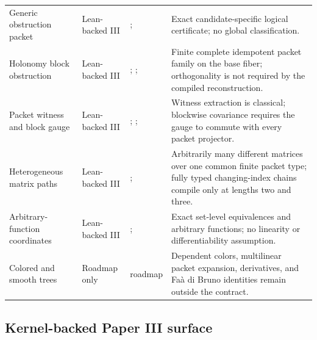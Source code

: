\begin{longtable}{L{0.17\textwidth}L{0.18\textwidth}L{0.25\textwidth}L{0.22\textwidth}}
\addlinespace
Generic obstruction packet
& Lean-backed III
& ; 
& Exact candidate-specific logical certificate; no global classification.\\
\addlinespace
Holonomy block obstruction
& Lean-backed III
& ; ; 
& Finite complete idempotent packet family on the base fiber; orthogonality is not required by the compiled reconstruction.\\
\addlinespace
Packet witness and block gauge
& Lean-backed III
& ; ; 
& Witness extraction is classical; blockwise covariance requires the gauge to commute with every packet projector.\\
\addlinespace
Heterogeneous matrix paths
& Lean-backed III
& ; 
& Arbitrarily many different matrices over one common finite packet type; fully typed changing-index chains compile only at lengths two and three.\\
\addlinespace
Arbitrary-function coordinates
& Lean-backed III
& ; 
& Exact set-level equivalences and arbitrary functions; no linearity or differentiability assumption.\\
\addlinespace
Colored and smooth trees
& Roadmap only
& roadmap 
& Dependent colors, multilinear packet expansion, derivatives, and Fa\`a di Bruno identities remain outside the contract.\\
\bottomrule
\end{longtable}
\normalsize

\subsection{Kernel-backed Paper III surface}

